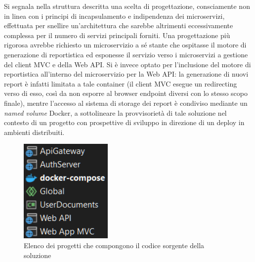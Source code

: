Si segnala nella struttura descritta una scelta di progettazione, consciamente non in linea con i principi di incapsulamento e indipendenza dei microservizi, effettuata per snellire un'architettura che sarebbe altrimenti eccessivamente complessa per il numero di servizi principali forniti.
Una progettazione più rigorosa avrebbe richiesto un microservizio a sé stante che ospitasse il motore di generazione di reportistica ed esponesse il servizio verso i microservizi a gestione del client MVC e della Web API. Si è invece optato per l'inclusione del motore di reportistica all'interno del microservizio per la Web API: la generazione di nuovi report è infatti limitata a tale container (il client MVC esegue un redirecting verso di esso, così da non esporre al browser endpoint diversi con lo stesso scopo finale), mentre l'accesso al sistema di storage dei report è condiviso mediante un \emph{named volume} Docker, a sottolineare la provvisorietà di tale soluzione nel contesto di un progetto con prospettive di sviluppo in direzione di un deploy in ambienti distribuiti.

\begin{figure}[H]
    \centering
    \includegraphics[width=0.4\textwidth]{fig/elenco_progetti.png}
    \caption{Elenco dei progetti che compongono il codice sorgente della soluzione}
\end{figure}